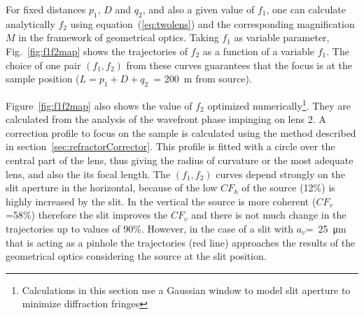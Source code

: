 \documentclass{iucr}              %
\begin{document}
For fixed distances $p_1$, $D$ and $q_2$, and also a given value of $f_1$, one can calculate analytically $f_2$ using  equation~(\ref{eq:twolens}) and the corresponding magnification $M$ in the framework of geometrical optics. Taking $f_1$ as variable parameter,  
Fig.~\ref{fig:f1f2map} shows the trajectories of $f_2$ as a function of a variable $f_1$. 
The choice of one pair $(f_1,f_2)$ from these curves guarantees that the focus is at the sample position ($L=p_1+D+q_2$~= \SI{200}{\meter} from source).

Figure~\ref{fig:f1f2map} also shows the value of $f_2$ optimized numerically\footnote{Calculations in this section use a Gaussian window to model slit aperture to minimize diffraction fringes}. They are calculated from the analysis of the wavefront phase impinging on lens 2. A correction profile to focus on the sample is calculated using the method described in section~\ref{sec:refractorCorrector}. This profile is fitted with a circle over the central part of the lens, thus giving the radius of curvature or the most adequate lens, and also the its focal length. 
The $(f_1,f_2)$ curves depend strongly on the slit aperture in the horizontal, because of the low $CF_h$ of the source (12\%) is highly increased by the slit. In the vertical the source is more coherent ($CF_v$=58\%) therefore the slit improves the $CF_v$  and there is not much change in the trajectories up to values of 90\%. However, in the case of a slit with $a_v$=~\SI{25}{\micro\meter} that is acting as a pinhole the trajectories (red line) approaches the results of the geometrical optics considering the source at the slit position. 
\end{document}
